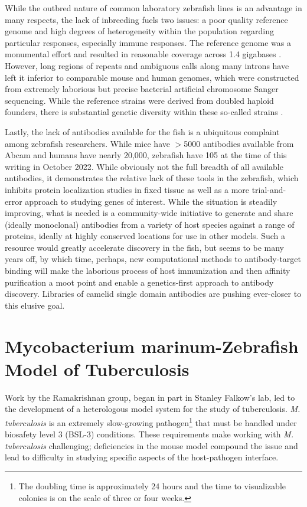 While the outbred nature of common laboratory zebrafish lines is an advantage in many respects, the lack of inbreeding fuels two issues: a poor quality reference genome and high degrees of heterogeneity within the population regarding particular responses, especially immune responses. The reference genome was a monumental effort and resulted in reasonable coverage across 1.4 gigabases \citep{Howe2013}. However, long regions of repeats and ambiguous calls along many introns have left it inferior to comparable mouse and human genomes, which were constructed from extremely laborious but precise bacterial artificial chromosome Sanger sequencing. While the reference strains were derived from doubled haploid founders, there is substantial genetic diversity within these so-called strains \citep{Suurvali2020, Holden2018}. 

Lastly, the lack of antibodies available for the fish is a ubiquitous complaint among zebrafish researchers. While mice have $>$5000 antibodies available from Abcam and humans have nearly 20,000, zebrafish have 105 at the time of this writing in October 2022. While obviously not the full breadth of all available antibodies, it demonstrates the relative lack of these tools in the zebrafish, which inhibits protein localization studies in fixed tissue as well as a more trial-and-error approach to studying genes of interest. While the situation is steadily improving, what is needed is a community-wide initiative to generate and share (ideally monoclonal) antibodies from a variety of host species against a range of proteins, ideally at highly conserved locations for use in other models. Such a resource would greatly accelerate discovery in the fish, but seems to be many years off, by which time, perhaps, new computational methods to antibody-target binding will make the laborious process of host immunization and then affinity purification a moot point and enable a genetics-first approach to antibody discovery. Libraries of camelid single domain antibodies are pushing ever-closer to this elusive goal.

\section{Mycobacterium marinum-Zebrafish Model of Tuberculosis}\label{zfmm}

Work by the Ramakrishnan group, began in part in Stanley Falkow's lab, led to the development of a heterologous model system for the study of tuberculosis. \textit{M. tuberculosis} is an extremely slow-growing pathogen\footnote{The doubling time is approximately 24 hours and the time to visualizable colonies is on the scale of three or four weeks.} that must be handled under biosafety level 3 (BSL-3) conditions. These requirements make working with \textit{M. tuberculosis} challenging; deficiencies in the mouse model compound the issue and lead to difficulty in studying specific aspects of the host-pathogen interface.

